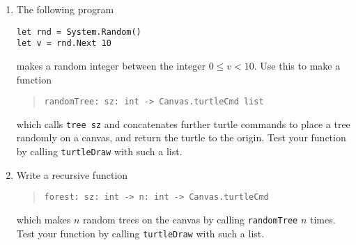 \begin{enumerate}
\item The following program
\begin{lstlisting}
let rnd = System.Random()
let v = rnd.Next 10
\end{lstlisting}
makes a random integer between the integer $0\leq v < 10$. Use this to make a function
\begin{quote}
  \lstinline{randomTree: sz: int -> Canvas.turtleCmd list}
\end{quote}
which calls \lstinline{tree sz} and concatenates further turtle commands to place a tree randomly on a canvas, and return the turtle to the origin. Test your function by calling \lstinline{turtleDraw} with such a list.
\item Write a recursive function
\begin{quote}
  \lstinline{forest: sz: int -> n: int -> Canvas.turtleCmd}
\end{quote}
which makes $n$ random trees on the canvas by calling \lstinline{randomTree} $n$ times. Test your function by calling \lstinline{turtleDraw} with such a list.
\end{enumerate}
